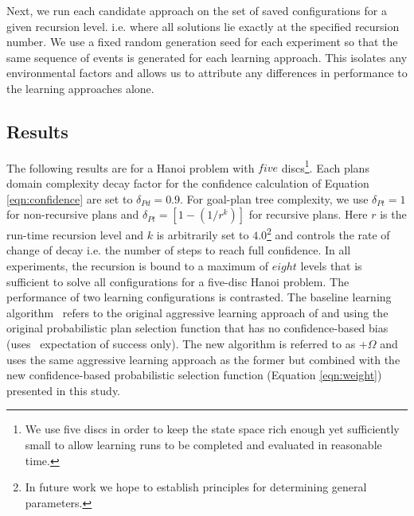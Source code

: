 Next, we run each candidate approach on the set of saved configurations for a given recursion level. i.e. where all solutions lie exactly at the specified recursion number. We use a fixed random generation seed for each experiment so that the same sequence of  events is generated for each learning approach. This isolates any environmental factors and allows us to attribute any differences in performance to the learning approaches alone.


\subsection{Results}

The following results are for a Hanoi problem with $five$ discs\footnote{We use five discs in order to keep the state space rich enough yet sufficiently small to allow learning runs to be completed and evaluated in reasonable time.}. Each plans domain complexity decay factor for the confidence calculation of Equation \ref{eqn:confidence} are set to $\delta_{Pd} = 0.9$. For goal-plan tree complexity, we use $\delta_{Pt} =1$ for non-recursive plans and $\delta_{Pt} =\left[1-(1/r^k)\right]$ for recursive plans. Here $r$ is the run-time recursion level and $k$ is arbitrarily set to $4.0$\footnote{In future work we hope to establish principles for determining general parameters.} and controls the rate of change of decay i.e. the number of steps to reach full confidence. In all experiments, the recursion is bound to a maximum of $eight$ levels that is sufficient to solve all configurations for a five-disc Hanoi problem. The performance of two learning configurations is contrasted. The baseline learning algorithm \CL\ refers to the original aggressive learning approach of \cite{Airiau:IJAT:09} and \cite{Singh:AAMAS10} using the original probabilistic plan selection function that has no confidence-based bias (uses \dt\ expectation of success only). The new algorithm is referred to as \CL+$\Omega$ and uses the same aggressive learning approach as the former but combined with the new confidence-based probabilistic selection function (Equation \ref{eqn:weight}) presented in this study.

